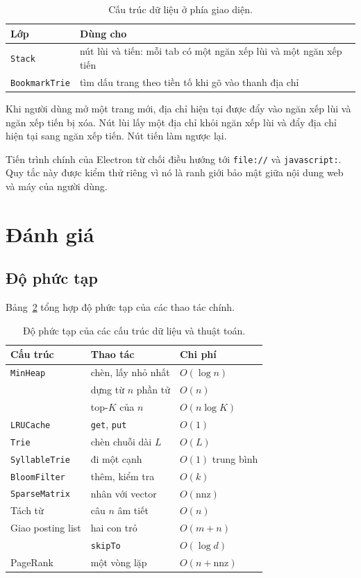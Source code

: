 \documentclass[9pt,twocolumn,a4paper]{extarticle}
\newcommand{\code}[1]{\texttt{#1}}
\begin{document}
\begin{table}[H]
\centering
\caption{Cấu trúc dữ liệu ở phía giao diện.}
\label{tab:frontend}
\footnotesize
\begin{tabular}{@{}p{2.2cm}p{5.4cm}@{}}
\toprule
Lớp & Dùng cho \\
\midrule
\code{Stack} & nút lùi và tiến: mỗi tab có một ngăn xếp lùi và một ngăn xếp tiến \\
\code{BookmarkTrie} & tìm dấu trang theo tiền tố khi gõ vào thanh địa chỉ \\
\bottomrule
\end{tabular}
\end{table}

Khi người dùng mở một trang mới, địa chỉ hiện tại được đẩy vào ngăn xếp lùi và ngăn xếp tiến bị xóa. Nút lùi lấy một địa chỉ khỏi ngăn xếp lùi và đẩy địa chỉ hiện tại sang ngăn xếp tiến. Nút tiến làm ngược lại.

Tiến trình chính của Electron từ chối điều hướng tới \code{file://} và \code{javascript:}. Quy tắc này được kiểm thử riêng vì nó là ranh giới bảo mật giữa nội dung web và máy của người dùng.

\section{Đánh giá}
\label{chap:eval}

\subsection{Độ phức tạp}
Bảng~\ref{tab:complexity} tổng hợp độ phức tạp của các thao tác chính.

\begin{table}[H]
\centering
\caption{Độ phức tạp của các cấu trúc dữ liệu và thuật toán.}
\label{tab:complexity}
\footnotesize
\begin{tabular}{@{}p{2.5cm}p{2.9cm}l@{}}
\toprule
Cấu trúc & Thao tác & Chi phí \\
\midrule
\code{MinHeap} & chèn, lấy nhỏ nhất & $O(\log n)$ \\
 & dựng từ $n$ phần tử & $O(n)$ \\
 & top-$K$ của $n$ & $O(n\log K)$ \\
\code{LRUCache} & \code{get}, \code{put} & $O(1)$ \\
\code{Trie} & chèn chuỗi dài $L$ & $O(L)$ \\
\code{SyllableTrie} & đi một cạnh & $O(1)$ trung bình \\
\code{BloomFilter} & thêm, kiểm tra & $O(k)$ \\
\code{SparseMatrix} & nhân với vector & $O(\text{nnz})$ \\
Tách từ & câu $n$ âm tiết & $O(n)$ \\
Giao posting list & hai con trỏ & $O(m+n)$ \\
 & \code{skipTo} & $O(\log d)$ \\
PageRank & một vòng lặp & $O(n+\text{nnz})$ \\
\bottomrule
\end{tabular}
\end{table}
\end{document}
